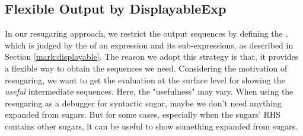 \subsection{Flexible Output by DisplayableExp}
\label{mark:correctness}

In our resugaring approach, we restrict the output sequences by defining the , which is judged by the  of an expression and its sub-expressions, as described in Section \ref{mark:displayable}. The reason we adopt this strategy is that, it provides a flexible way to obtain the sequences we need. Considering the motivation of resugaring, we want to get the evaluation at the surface level for showing the \emph{useful} intermediate sequences. Here, the "usefulness" may vary. When using the resugaring as a debugger for syntactic sugar, maybe we don't need anything expanded from sugars. But for some cases, especially when the sugars' RHS contains other sugars, it can be useful to show something expanded from sugars.

